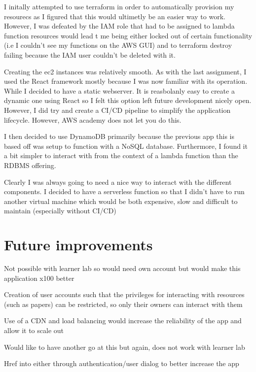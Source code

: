 \documentclass[12pt]{article}
\begin{document}
I initally attempted to use terraform in order to automatically provision my resourecs as I figured that this would ultimetly be an easier way to work.
However, I was defeated by the IAM role that had to be assigned to lambda function resources would lead t me being either locked out of certain functionality (i.e I couldn't see my functions on the AWS GUI) and to terraform destroy failing because the IAM user couldn't be deleted with it.

Creating the ec2 instances was relatively smooth. As with the last assignment, I used the React framework mostly because I was now familiar with its operation. While I decided to have a static webserver. It is reasbolanly easy to create a dynamic one using React so I felt this option left future development nicely open.
However, I did try and create a CI/CD pipeline to simplify the application lifecycle. However, AWS academy does not let you do this.

I then decided to use DynamoDB primarily because the previous app this is based off was setup to function with a NoSQL database. Furthermore, I found it a bit simpler to interact with from the context of a lambda function than the RDBMS offering.

Clearly I was always going to need a nice way to interact with the different components. I decided to have a serverless function so that I didn't have to run another virtual machine which would be both expensive, slow and difficult to maintain (especially without CI/CD)



\section{Future improvements}

Not possible with learner lab so would need own account but would make this application x100 better

Creation of user accounts such that the privileges for interacting with resources (such as papers) can be restricted, so only their owners can interact with them

Use of a CDN and load balancing would increase the reliability of the app and allow it to scale out 

Would like to have another go at this but again, does not work with learner lab

Href into either through authentication/user dialog to better increase the app 

\end{document}

